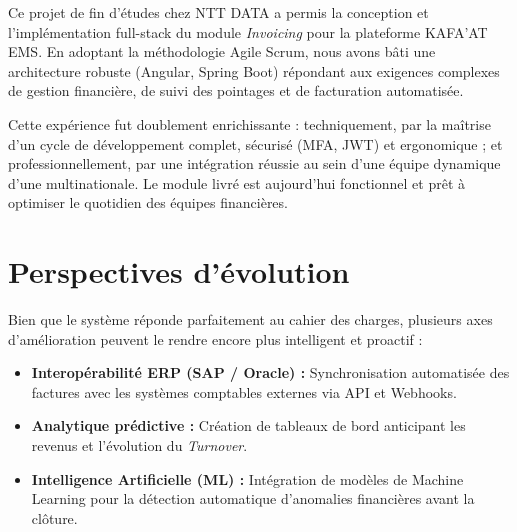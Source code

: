 \documentclass[12pt, a4paper, openany]{report}
\begin{document}
\begin{large}
\setlength{\parskip}{0.3cm}
\renewcommand{\baselinestretch}{1.3}\selectfont

Ce projet de fin d'études chez NTT DATA a permis la conception et l'implémentation full-stack du module \textit{Invoicing} pour la plateforme KAFA'AT EMS. En adoptant la méthodologie Agile Scrum, nous avons bâti une architecture robuste (Angular, Spring Boot) répondant aux exigences complexes de gestion financière, de suivi des pointages et de facturation automatisée.

Cette expérience fut doublement enrichissante : techniquement, par la maîtrise d'un cycle de développement complet, sécurisé (MFA, JWT) et ergonomique ; et professionnellement, par une intégration réussie au sein d'une équipe dynamique d'une multinationale. Le module livré est aujourd'hui fonctionnel et prêt à optimiser le quotidien des équipes financières.

\vspace{-0.7cm}

\section*{Perspectives d'évolution}

\vspace{-0.7cm}

Bien que le système réponde parfaitement au cahier des charges, plusieurs axes d'amélioration peuvent le rendre encore plus intelligent et proactif :

\begin{itemize}
    \renewcommand{\labelitemi}{\textcolor{primaryBlue}{\textbf{\large \ding{118}}}}
    \setlength{\itemsep}{0.2cm}
    
   \vspace{-0.5cm}
    \item \textcolor{primaryBlue}{\textbf{Interopérabilité ERP (SAP / Oracle) :}} Synchronisation automatisée des factures avec les systèmes comptables externes via API et Webhooks.
    
    \vspace{-0.5cm}
    \item \textcolor{primaryBlue}{\textbf{Analytique prédictive :}} Création de tableaux de bord anticipant les revenus et l'évolution du \textit{Turnover}.
    
    \vspace{-0.5cm}
    \item \textcolor{primaryBlue}{\textbf{Intelligence Artificielle (ML) :}} Intégration de modèles de Machine Learning pour la détection automatique d'anomalies financières avant la clôture.
    

\end{itemize}
\end{large}
\end{document}
